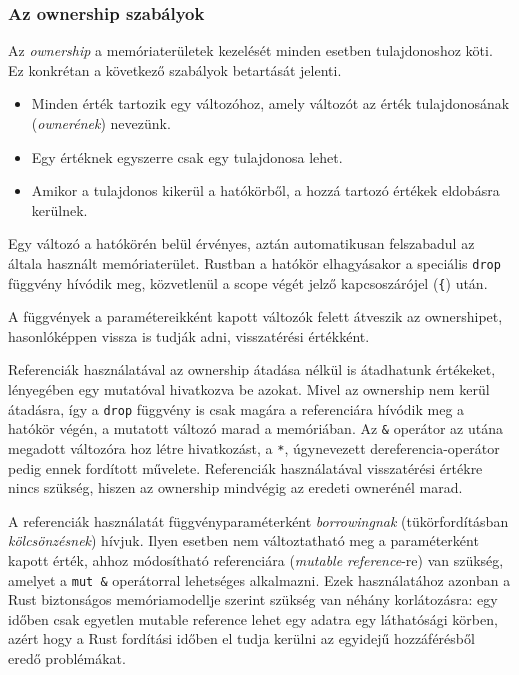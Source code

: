 \subsubsection{Az ownership szabályok}

Az \textit{ownership} a memóriaterületek kezelését minden esetben tulajdonoshoz köti. Ez konkrétan a következő szabályok betartását jelenti.
\begin{itemize}
  \item Minden érték tartozik egy változóhoz, amely változót az érték tulajdonosának (\textit{ownerének}) nevezünk.
  \item Egy értéknek egyszerre csak egy tulajdonosa lehet.
  \item Amikor a tulajdonos kikerül a hatókörből, a hozzá tartozó értékek eldobásra kerülnek.
\end{itemize}

Egy változó a hatókörén belül érvényes, aztán automatikusan felszabadul az általa használt memóriaterület. Rustban a hatókör elhagyásakor a speciális \lstinline{drop} függvény hívódik meg, közvetlenül a scope végét jelző kapcsoszárójel (\lstinline{{}) után.

A függvények a paramétereikként kapott változók felett átveszik az ownershipet, hasonlóképpen vissza is tudják adni, visszatérési értékként.

Referenciák használatával az ownership átadása nélkül is átadhatunk értékeket, lényegében egy mutatóval hivatkozva be azokat. Mivel az ownership nem kerül átadásra, így a \lstinline{drop} függvény is csak magára a referenciára hívódik meg a hatókör végén, a mutatott változó marad a memóriában. Az \lstinline{&} operátor az utána megadott változóra hoz létre hivatkozást, a \lstinline{*}, úgynevezett dereferencia-operátor pedig ennek fordított művelete.
Referenciák használatával visszatérési értékre nincs szükség, hiszen az ownership mindvégig az eredeti ownerénél marad.

A referenciák használatát függvényparaméterként \textit{borrowingnak} (tükörfordításban \textit{kölcsönzésnek}) hívjuk. Ilyen esetben nem változtatható meg a paraméterként kapott érték, ahhoz módosítható referenciára (\textit{mutable reference}-re) van szükség, amelyet a \lstinline{mut &} operátorral lehetséges alkalmazni. Ezek használatához azonban a Rust biztonságos memóriamodellje szerint szükség van néhány korlátozásra: egy időben csak egyetlen mutable reference lehet egy adatra egy láthatósági körben, azért hogy a Rust fordítási időben el tudja kerülni az egyidejű hozzáférésből eredő problémákat.

